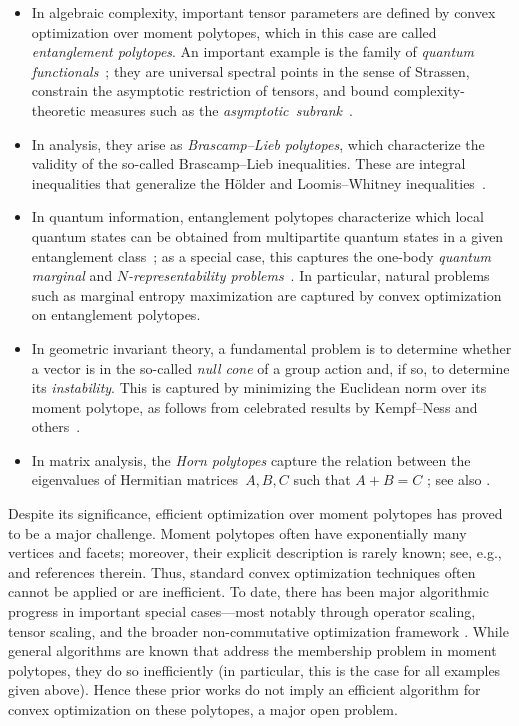\documentclass[11pt,letterpaper]{article}
\numberwithin{equation}{section}
\begin{document}
\begin{itemize}
    \item In algebraic complexity, important tensor parameters are defined by convex optimization over moment polytopes, which in this case are called \emph{entanglement polytopes}.
    An important example is the family of \emph{quantum functionals}~\cite{CVZ2018}; they are universal spectral points in the sense of Strassen, constrain the asymptotic restriction of tensors, and bound complexity-theoretic measures such as the \emph{asymptotic~subrank}~\cite{Burgisser-book,zuiddam2018algebraic}.
    \item In analysis, they arise as \emph{Brascamp--Lieb polytopes}, which characterize the validity of the so-called Brascamp--Lieb inequalities.
    These are integral inequalities that generalize the H\"older and Loomis--Whitney inequalities~\cite{bennett2008brascamp,GGOW-18}.
	\item In quantum information, entanglement polytopes characterize which local quantum states can be obtained from multipartite quantum states in a given entanglement class~\cite{WDGC2013_entanglement}; as a special case, this captures the one-body \emph{quantum marginal} and \emph{$N$-representability problems}~\cite{Klyachko02,Klyachko04,Klyachko06}.
    In particular, natural problems such as marginal entropy maximization are captured by convex optimization on entanglement polytopes.
	\item In geometric invariant theory, a fundamental problem is to determine whether a vector is in the so-called \emph{null cone} of a group action and, if so, to determine its \emph{instability}.
    This is captured by minimizing the Euclidean norm over its moment polytope, as follows from celebrated results by Kempf--Ness and others~\cite{Kempf-78,Kempf-Ness-79,NessMumford1984,Kirwan1984}.
    \item In matrix analysis, the \emph{Horn polytopes} capture the relation between the eigenvalues of Hermitian matrices~$A,B,C$ such that $A+B=C$ \cite{Horn-62,Klyachko-98,Knutson-Tao}; see also \cite{Fulton-00}.
\end{itemize}
Despite its significance, efficient optimization over moment polytopes has proved to be a major challenge.
Moment polytopes often have exponentially many vertices and facets; moreover, their explicit description is rarely known; see, e.g., \cite{vandenberg2025computing} and references therein.
Thus, standard convex optimization techniques often cannot be applied or are inefficient.
To date, there has been major algorithmic progress in important special cases---most notably through operator scaling, tensor scaling, and the broader non-commutative optimization framework \cite{GGOW-16,GGOW-18,Franks2018,AGLOW-18,BGOWW-alternating,BFGOWW2018,BFGOWW2019,HNW2023,Hirai2025}.
While general algorithms are known that address the membership problem in moment polytopes, they do so inefficiently (in particular, this is the case for all examples given above).
Hence these prior works do not imply an efficient algorithm for convex optimization on these polytopes, a major open problem.
\end{document}
